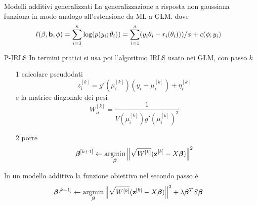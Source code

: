 \documentclass{beamer}\usepackage[]{graphicx}\usepackage[]{color}
\begin{document}
\begin{frame}[t]{Modelli additivi generalizzati}  
La generalizzazione a risposta non gaussiana funziona in modo analogo all'estensione da ML  a GLM.
dove 
\[
 \ell({\bf \beta},{\bf b},\phi) = \sum_{i=1}^n \log(p(y_i;\theta_i))
  = \sum_{i=1}^n (y_i\theta_i-r_i(\theta_i)))/\phi + c(\phi;y_i)
\]
\end{frame}

\begin{frame}{P-IRLS}
In termini pratici si usa poi l'algoritmo IRLS usato nei GLM, con passo $k$
\begin{itemize}
\item[1] calcolare pseudodati
\[ z_i^{[k]} = g'(\mu_i^{[k]})(y_i-\mu_i^{[k]}) + \eta_i^{[k]} \]
e la matrice diagonale dei pesi
\[ W_{ii}^{[k]} = \frac{1}{V(\mu_i^{[k]})g'(\mu_i^{[k]})^2}\]
\item[2] porre
\[
{\bm\beta}^{[k+1]} \leftarrow 
\underset{{\bm{\beta}}}{\mbox{argmin}} \left\Vert\sqrt{W^{[k]}} ({\bf z}^{[k]}-X{\bm\beta})\right\Vert^2
\]
\end{itemize}

In un modello additivo la funzione obiettivo nel secondo passo \`e
\[
{\bm\beta}^{[k+1]} \leftarrow 
\underset{{\bm{\beta}}}{\mbox{argmin}} \left\Vert\sqrt{W^{[k]}} ({\bf z}^{[k]}-X{\bm\beta})\right\Vert^2
 + \lambda {\bm\beta}^TS{\bm\beta}\]
\end{frame}
\end{document}
